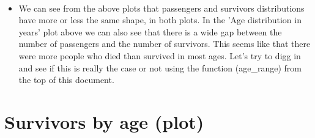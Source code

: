 \documentclass[11pt]{article}
\providecommand{\tightlist}{%
      \setlength{\itemsep}{0pt}\setlength{\parskip}{0pt}}
\begin{document}
    \begin{center}
    \end{center}
    { \hspace*{\fill} \\}
    
    \begin{itemize}
\tightlist
\item
  We can see from the above plots that passengers and survivors
  distributions have more or less the same shape, in both plots. In the
  'Age distribution in years' plot above we can also see that there is a
  wide gap between the number of passengers and the number of survivors.
  This seems like that there were more people who died than survived in
  most ages. Let's try to digg in and see if this is really the case or
  not using the function (age\_range) from the top of this document.
\end{itemize}

    \section{Survivors by age (plot)}\label{survivors-by-age-plot}
\end{document}
